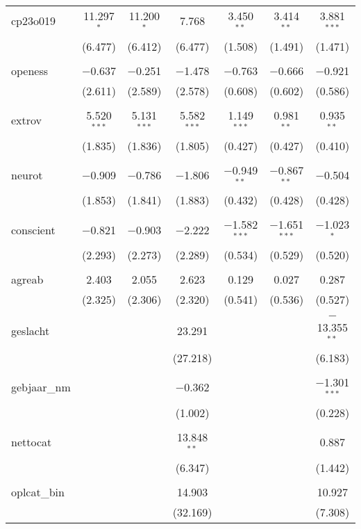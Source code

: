 \begin{table}[!htbp]
\begin{tabular}{@{\extracolsep{5pt}}lcccccc}
 cp23o019 & 11.297$^{*}$ & 11.200$^{*}$ & 7.768 & 3.450$^{**}$ & 3.414$^{**}$ & 3.881$^{***}$ \\ 
  & (6.477) & (6.412) & (6.477) & (1.508) & (1.491) & (1.471) \\ 
  & & & & & & \\ 
 openess & $-$0.637 & $-$0.251 & $-$1.478 & $-$0.763 & $-$0.666 & $-$0.921 \\ 
  & (2.611) & (2.589) & (2.578) & (0.608) & (0.602) & (0.586) \\ 
  & & & & & & \\ 
 extrov & 5.520$^{***}$ & 5.131$^{***}$ & 5.582$^{***}$ & 1.149$^{***}$ & 0.981$^{**}$ & 0.935$^{**}$ \\ 
  & (1.835) & (1.836) & (1.805) & (0.427) & (0.427) & (0.410) \\ 
  & & & & & & \\ 
 neurot & $-$0.909 & $-$0.786 & $-$1.806 & $-$0.949$^{**}$ & $-$0.867$^{**}$ & $-$0.504 \\ 
  & (1.853) & (1.841) & (1.883) & (0.432) & (0.428) & (0.428) \\ 
  & & & & & & \\ 
 conscient & $-$0.821 & $-$0.903 & $-$2.222 & $-$1.582$^{***}$ & $-$1.651$^{***}$ & $-$1.023$^{*}$ \\ 
  & (2.293) & (2.273) & (2.289) & (0.534) & (0.529) & (0.520) \\ 
  & & & & & & \\ 
 agreab & 2.403 & 2.055 & 2.623 & 0.129 & 0.027 & 0.287 \\ 
  & (2.325) & (2.306) & (2.320) & (0.541) & (0.536) & (0.527) \\ 
  & & & & & & \\ 
 geslacht &  &  & 23.291 &  &  & $-$13.355$^{**}$ \\ 
  &  &  & (27.218) &  &  & (6.183) \\ 
  & & & & & & \\ 
 gebjaar\_nm &  &  & $-$0.362 &  &  & $-$1.301$^{***}$ \\ 
  &  &  & (1.002) &  &  & (0.228) \\ 
  & & & & & & \\ 
 nettocat &  &  & 13.848$^{**}$ &  &  & 0.887 \\ 
  &  &  & (6.347) &  &  & (1.442) \\ 
  & & & & & & \\ 
 oplcat\_bin &  &  & 14.903 &  &  & 10.927 \\ 
  &  &  & (32.169) &  &  & (7.308) \\ 

\end{tabular}
\end{table}
